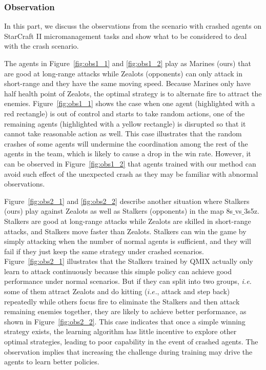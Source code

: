 \documentclass{article}
\begin{document}
\subsubsection{Observation}
In this part, we discuss the observations from the scenario with crashed agents on StarCraft II micromanagement tasks and show what to be considered to deal with the crash scenario. 

The agents in Figure~\ref{fig:obs1_1} and \ref{fig:obs1_2} play as Marines (ours) that are good at long-range attacks while Zealots (opponents) can only attack in short-range and they have the same moving speed. Because Marines only have half health point of Zealots, the optimal strategy is to alternate fire to attract the enemies. Figure~\ref{fig:obs1_1} shows the case when one agent (highlighted with a red rectangle) is out of control and starts to take random actions, one of the remaining agents (highlighted with a yellow rectangle) is disrupted so that it cannot take reasonable action as well. This case illustrates that the random crashes of some agents will undermine the coordination among the rest of the agents in the team, which is likely to cause a drop in the win rate. However, it can be observed in Figure~\ref{fig:obs1_2} that agents trained with our method can avoid such effect of the unexpected crash as they may be familiar with abnormal observations.

Figure~\ref{fig:obs2_1} and \ref{fig:obs2_2} describe another situation where Stalkers (ours) play against Zealots as well as Stalkers (opponents) in the map 8s$\_$vs$\_$3s5z.
Stalkers are good at long-range attacks while Zealots are skilled in short-range attacks, and Stalkers move faster than Zealots.
Stalkers can win the game by simply attacking when the number of normal agents is sufficient, and they will fail if they just keep the same strategy under crashed scenarios. Figure~\ref{fig:obs2_1} illustrates that the Stalkers trained by QMIX actually only learn to attack continuously because this simple policy can achieve good performance under normal scenarios.
But if they can split into two groups, \emph{i.e.} some of them attract Zealots and do kitting ($i.e.$, attack and step back) repeatedly while others focus fire to eliminate the Stalkers and then attack remaining enemies together, they are likely to achieve better performance, as shown in Figure~\ref{fig:obs2_2}.
This case indicates that once a simple winning strategy exists, the learning algorithm has little incentive to explore other optimal strategies, leading to poor capability in the event of crashed agents.
The observation implies that increasing the challenge during training may drive the agents to learn better policies.
\end{document}
